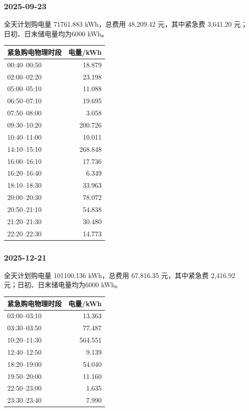 \subsubsection*{2025-09-23}
\begin{center}\small\quad\end{center}
全天计划购电量 71761.883 kWh，总费用 48,209.42 元，其中紧急费 3,641.20 元；日初、日末储电量均为6000 kWh。
\begin{longtable}{lr}\toprule 紧急购电物理时段 & 电量/kWh\\\midrule\endhead
00:40--00:50 & 18.879 \\
02:00--02:20 & 23.198 \\
05:00--05:10 & 11.088 \\
06:50--07:10 & 19.695 \\
07:50--08:00 & 3.058 \\
09:30--10:20 & 200.726 \\
10:40--11:00 & 10.011 \\
14:10--15:10 & 268.848 \\
16:00--16:10 & 17.736 \\
16:20--16:40 & 6.349 \\
18:10--18:30 & 33.963 \\
20:00--20:30 & 78.072 \\
20:50--21:10 & 54.838 \\
21:20--21:30 & 30.480 \\
22:20--22:30 & 14.773 \\
\bottomrule\end{longtable}
\subsubsection*{2025-12-21}
\begin{center}\small\quad\end{center}
全天计划购电量 101100.136 kWh，总费用 67,816.35 元，其中紧急费 2,416.92 元；日初、日末储电量均为6000 kWh。
\begin{longtable}{lr}\toprule 紧急购电物理时段 & 电量/kWh\\\midrule\endhead
03:00--03:10 & 13.363 \\
03:30--03:50 & 77.487 \\
10:20--11:30 & 564.551 \\
12:40--12:50 & 9.139 \\
18:20--19:00 & 54.040 \\
19:50--20:00 & 11.160 \\
22:50--23:00 & 1.635 \\
23:30--23:40 & 7.990 \\
\bottomrule\end{longtable}